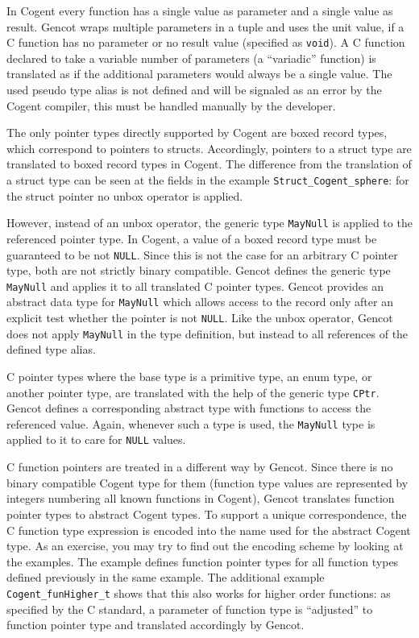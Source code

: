 \documentclass[a4paper]{report}
\newcommand{\code}[1]{\textnormal{\texttt{#1}}}
\begin{document}
In Cogent every function has a single value as parameter and a single value as result. Gencot wraps multiple parameters
in a tuple and uses the unit value, if a C function has no parameter or no result value (specified as \code{void}).
A C function declared to take a variable number of parameters (a ``variadic'' function) is translated as if the 
additional parameters would always be a single value. The used pseudo type alias is not defined and will be signaled
as an error by the Cogent compiler, this must be handled manually by the developer.

The only pointer types directly supported by Cogent are boxed record types, which correspond to pointers to structs.
Accordingly, pointers to a struct type are translated to boxed record types in Cogent. The difference from the translation
of a struct type can be seen at the fields in the example \code{Struct\_Cogent\_sphere}: for the struct pointer no
unbox operator is applied. 

However, instead of an unbox operator, the generic type \code{MayNull} is applied to the referenced pointer type. In 
Cogent, a value of a boxed record type must be guaranteed to be not \code{NULL}. Since this is not the case for an 
arbitrary C pointer type, both are not strictly binary compatible. Gencot defines the generic type \code{MayNull}
and applies it to all translated C pointer types. Gencot provides an abstract data type for \code{MayNull} which allows
access to the record only after an explicit test whether the pointer is not \code{NULL}. Like the unbox operator,
Gencot does not apply \code{MayNull} in the type definition, but instead to all references of the defined type alias.

C pointer types where the base type is a primitive type, an enum type, or another pointer type, are translated with the
help of the generic type \code{CPtr}. Gencot defines a corresponding abstract type with functions to access the 
referenced value. Again, whenever such a type is used, the \code{MayNull} type is applied to it to care for \code{NULL} 
values.

C function pointers are treated in a different way by Gencot. Since there is no binary compatible Cogent type for them 
(function type values are represented by integers numbering all known functions in Cogent), Gencot translates function pointer
types to abstract Cogent types. To support a unique correspondence, the C function type expression is encoded into
the name used for the abstract Cogent type. As an exercise, you may try to find out the encoding scheme by looking
at the examples. The example defines function pointer types for all function types defined previously in the same example. 
The additional example \code{Cogent\_funHigher\_t} shows that this also works for higher order functions: as specified by the 
C standard, a parameter of function type is ``adjusted'' to function pointer type and translated accordingly by Gencot.
\end{document}
